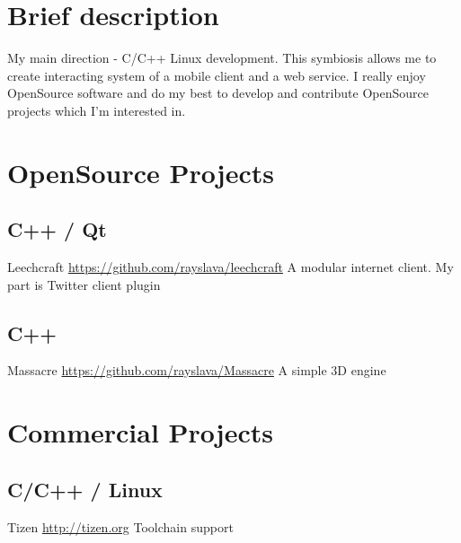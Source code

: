 \documentclass[11pt,a4paper]{moderncv}
\begin{document}
\maketitle

\section{Brief description}
\cvitem
  {}
  {My main direction - C/C++ Linux development.\newline{}
  This symbiosis allows me to create interacting system of a mobile client and a web service.\newline{}
  I really enjoy OpenSource software and do my best to develop and contribute OpenSource projects which I'm interested in.}

\section{OpenSource Projects}
\subsection{C++ / Qt}
\cvitem
  {Leechcraft}
  {\url{https://github.com/rayslava/leechcraft}\newline{}
  A modular internet client. My part is Twitter client plugin}
\subsection{C++}
\cvitem
  {Massacre}
  {\url{https://github.com/rayslava/Massacre}\newline{}
  A simple 3D engine}

\section{Commercial Projects}
  \subsection{C/C++ / Linux}
  \cvitem
    {Tizen}
    {\url{http://tizen.org}\newline{}
    Toolchain support}
\end{document}
